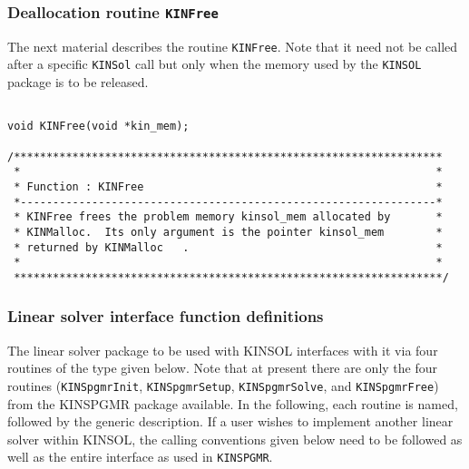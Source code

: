 \subsubsection{Deallocation routine {\tt KINFree}}

The next material describes the routine {\tt KINFree}. Note that it need
not be called after a specific {\tt KINSol} call but only when the
memory used by the {\tt KINSOL} package is to be released.

\small
\begin{verbatim}

void KINFree(void *kin_mem);
 
/******************************************************************
 *                                                                *
 * Function : KINFree                                             *
 *----------------------------------------------------------------*
 * KINFree frees the problem memory kinsol_mem allocated by       *
 * KINMalloc.  Its only argument is the pointer kinsol_mem        *
 * returned by KINMalloc   .                                      *
 *                                                                *
 ******************************************************************/
\end{verbatim}
\normalsize 

\subsubsection{Linear solver interface function definitions}


The linear solver package to be used with KINSOL interfaces with it 
via four routines of the type given below. Note that at present there
are only the four routines ({\tt KINSpgmrInit}, {\tt KINSpgmrSetup}, 
{\tt KINSpgmrSolve}, and {\tt KINSpgmrFree}) from the KINSPGMR package available.
In the following, each routine is named, followed by the generic description.
If a user wishes to implement another linear solver within KINSOL, the calling
conventions given below need to be followed as well as the entire interface
as used in {\tt KINSPGMR}.

\small


